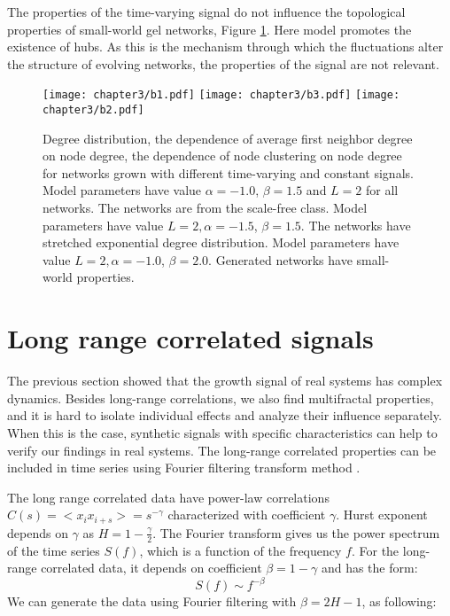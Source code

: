 The properties of the time-varying signal do not influence the topological properties of small-world gel networks, Figure \ref{fig:properties_net}. Here model promotes the existence of hubs. As this is the mechanism through which the fluctuations alter the structure of evolving networks, the properties of the signal are not relevant.   

\begin{figure}[H]
	\centering
	\texttt{[image: chapter3/b1.pdf]}
	\texttt{[image: chapter3/b3.pdf]}
	\texttt{[image: chapter3/b2.pdf]}
	\caption[Structural properties of networks.]{Degree distribution, the dependence of average first neighbor degree on node degree, the dependence of node clustering on node degree for networks grown with different time-varying and constant signals. Model parameters have value $\alpha=-1.0$, $\beta=1.5$  and $L=2$ for all networks. The networks are from the scale-free class. Model parameters have value $L=2, \alpha=-1.5$, $\beta=1.5$. The networks have stretched exponential degree distribution. Model parameters have value $ L=2, \alpha=-1.0$, $\beta=2.0$. Generated networks have small-world properties.}
	\label{fig:properties_net}
\end{figure}

\section{Long range correlated signals}

The previous section showed that the growth signal of real systems has complex dynamics. Besides long-range correlations, we also find multifractal properties, and it is hard to isolate individual effects and analyze their influence separately. When this is the case, synthetic signals with specific characteristics can help to verify our findings in real systems. The long-range correlated properties can be included in time series using Fourier filtering transform method \cite{makse1996method}. 

The long range correlated data have power-law correlations $C(s)= <x_i x_{i+s}> = s ^ {-\gamma}$ characterized with coefficient $\gamma$. Hurst exponent depends on $\gamma$ as  $H = 1- \frac{\gamma}{2}$. The Fourier transform gives us the power spectrum of the time series $S(f)$, which is a function of the frequency $f$. For the long-range correlated data, it depends on coefficient $\beta = 1-\gamma$ and has the form:
\begin{equation}
S(f) \sim f^{-\beta}
\end{equation}
We can generate the data using Fourier filtering with $\beta = 2H - 1$, as following:

